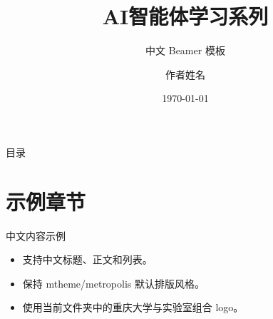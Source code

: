 \documentclass[UTF8,aspectratio=169,fontset=fandol]{ctexbeamer}
\title{AI智能体学习系列}
\subtitle{中文 Beamer 模板}
\author{作者姓名}
\institute{重庆大学}
\date{\today}
\begin{document}
\maketitle

\begin{frame}{目录}
  \tableofcontents
\end{frame}

\section{示例章节}

\begin{frame}{中文内容示例}
  \begin{itemize}
    \item 支持中文标题、正文和列表。
    \item 保持 mtheme/metropolis 默认排版风格。
    \item 使用当前文件夹中的重庆大学与实验室组合 logo。
  \end{itemize}
\end{frame}
\end{document}
